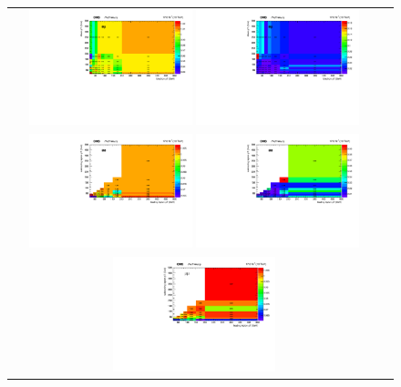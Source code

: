 \begin{figure}[!htb]
  \begin{center}
    \begin{tabular}{cc}
      \includegraphics[width=0.45\textwidth]{fig_2016postVFP_TrigSF/h2D_lepABpt_emu.pdf}
      \includegraphics[width=0.45\textwidth]{fig_2016postVFP_TrigSF/h2D_lepABpt_emu_BinErrors.pdf}\\       
      \includegraphics[width=0.45\textwidth]{fig_2016postVFP_TrigSF/h2D_lepABpt_ee.pdf}
      \includegraphics[width=0.45\textwidth]{fig_2016postVFP_TrigSF/h2D_lepABpt_ee_BinErrors.pdf}\\
      \includegraphics[width=0.45\textwidth]{fig_2016postVFP_TrigSF/h2D_lepABpt_mumu.pdf}

\end{tabular}
\end{center}
\end{figure}
